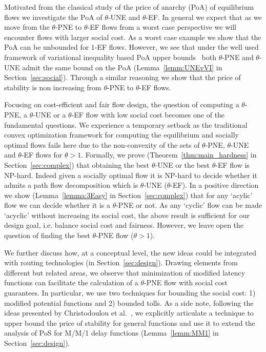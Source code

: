 Motivated from the classical study of the price of anarchy (PoA) of equilibrium flows we investigate the PoA of $\theta$-UNE and $\theta$-EF. In general we expect that as we move from the $\theta$-PNE to $\theta$-EF flows from a worst case perspective we will encounter flows with larger social cost. As a worst case example we show that the PoA can be unbounded for $1$-EF flows. However, we see that under the well used framework of variational inequality based PoA upper bounds~\cite{roughgarden2004bounding} both $\theta$-PNE and $\theta$-UNE admit the same bound on the PoA (Lemma~\ref{lemm:UNEvVI} in Section~\ref{sec:social}). Through a similar reasoning we show that the price of stability is non increasing from $\theta$-PNE to $\theta$-EF flows. 


Focusing on cost-efficient and fair flow design, the question of computing a $\theta$-PNE, a $\theta$-UNE or a $\theta$-EF flow with low social cost becomes one of the fundamental questions. We experience a temporary setback as the traditional convex optimization framework for computing the equilibrium and socially optimal flows fails here due to the non-convexity of the sets of $\theta$-PNE, $\theta$-UNE and $\theta$-EF flows for $\theta>1$. Formally, we prove (Theorem~\ref{thm:main_hardness} in Section~\ref{sec:complex}) that obtaining the best $\theta$-UNE or the best $\theta$-EF flow is NP-hard. Indeed given a socially optimal flow it is NP-hard to decide whether it admits a path flow decomposition which is $\theta$-UNE ($\theta$-EF). In a positive direction we show (Lemma~\ref{lemma:3Easy} in Section~\ref{sec:complex}) that for any `acylic' flow we can decide whether it is a $\theta$-PNE or not. As any `cyclic' flow can be made `acyclic' without increasing its social cost, the above result is sufficient for our design goal, i.e. balance social cost and fairness. However, we leave open the question of finding the best $\theta$-PNE flow ($\theta>1$). 

We further discuss how, at a conceptual level, the new ideas could be integrated with routing technologies (in Section~\ref{sec:design}). Drawing elements from different but related areas, we observe that minimization of modified latency functions can facilitate the calculation of a $\theta$-PNE flow with social cost guarantees. In particular, we use two techniques for bounding the social cost: 1) modified potential functions and 2) bounded tolls.  As a side note, following the ideas presented by Christodoulou et al.~\cite{christodoulou2011performance}, we explicitly articulate a technique to upper bound the price of stability for general functions and use it to extend the analysis of PoS for M/M/1 delay functions (Lemma~\ref{lemm:MM1} in Section~\ref{sec:design}).

